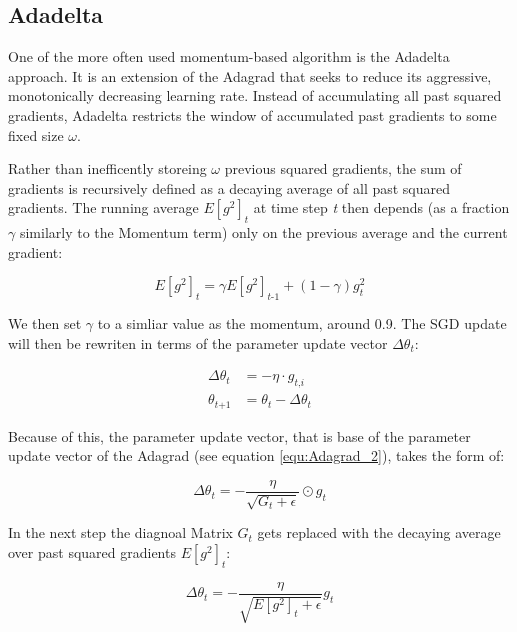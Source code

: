 \documentclass[12pt,oneside,a4paper,parskip]{scrbook}
\begin{document}
\subsection{Adadelta}
One of the more often used momentum-based algorithm is the Adadelta approach. It is an extension of the Adagrad that 
seeks to reduce its aggressive, monotonically decreasing learning rate. Instead of accumulating all past squared gradients, 
Adadelta restricts the window of accumulated past gradients to some fixed size $\omega$.  

Rather than inefficently storeing $\omega$ previous squared gradients, the sum of gradients is recursively defined as a 
decaying average of all past squared gradients. The running average $\textit{E}[\textit{g}^2]_t$  at time step \textit{t} 
then depends (as a fraction $\gamma $ similarly to the Momentum term) only on the previous average and the 
current gradient:

\begin{equation}
\textit{E}[\textit{g}^2]_t = \gamma\textit{E}[\textit{g}^2]_\textit{t-1} + (1-\gamma)\textit{g}^2_t
\label{equ:adadelta_1}
\end{equation}

We then set $\gamma$ to a simliar value as the momentum, around 0.9. The SGD update will then be rewriten in terms of the 
parameter update vector $\Delta\theta_\textit{t}$:

\begin{equation}
  \begin{split}
    \Delta\theta_\textit{t} &= -\eta \cdot \textit{g}_\textit{t,i} \\
    \theta_\textit{t+1} &= \theta_\textit{t} - \Delta\theta_\textit{t}
  \end{split}
\end{equation}

Because of this, the parameter update vector, that is base of the parameter update vector of the Adagrad (see equation \ref{equ:Adagrad_2}), 
takes the form of:

\begin{equation}
  \Delta\theta_\textit{t} = -\frac{\eta}{\sqrt{\textit{G}_\textit{t} + \epsilon}} \odot \textit{g}_\textit{t}
\end{equation}

In the next step the diagnoal Matrix $\textit{G}_t$ gets replaced with the decaying average over past squared gradients 
$\textit{E}[\textit{g}^2]_\textit{t}$:

\begin{equation}
  \Delta\theta_\textit{t} = -\frac{\eta}{\sqrt{\textit{E}[\textit{g}^2]_\textit{t} + \epsilon}} \textit{g}_\textit{t}
\end{equation}
\end{document}
